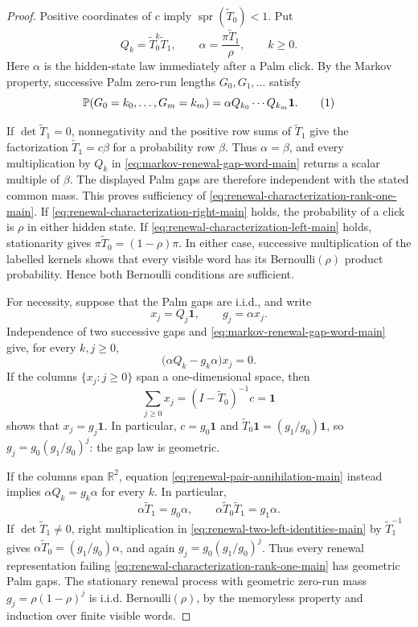 \begin{proof}
Positive coordinates of \(c\) imply
\(\operatorname{spr}(\widetilde T_0)<1\).  Put
\[
 Q_k=\widetilde T_0^k\widetilde T_1,
 \qquad
 \alpha=\frac{\pi\widetilde T_1}{\rho},
 \qquad k\ge0.
\]
Here \(\alpha\) is the hidden-state law immediately after a Palm click.  By
the Markov property, successive Palm zero-run lengths \(G_0,G_1,\ldots\)
satisfy
\[
 \mathbb{P}(G_0=k_0,\ldots,G_m=k_m)
 =\alpha Q_{k_0}\cdots Q_{k_m}\mathbf1.       \tag{1}\label{eq:markov-renewal-gap-word-main}
\]

If \(\det\widetilde T_1=0\), nonnegativity and the positive row sums of
\(\widetilde T_1\) give the factorization
\(\widetilde T_1=c\beta\) for a probability row \(\beta\).  Thus
\(\alpha=\beta\), and every multiplication by \(Q_k\) in
\eqref{eq:markov-renewal-gap-word-main} returns a scalar multiple of
\(\beta\).  The displayed Palm gaps are therefore independent with the
stated common mass.  This proves sufficiency of
\eqref{eq:renewal-characterization-rank-one-main}.  If
\eqref{eq:renewal-characterization-right-main} holds, the probability of a
click is \(\rho\) in either hidden state.  If
\eqref{eq:renewal-characterization-left-main} holds, stationarity gives
\(\pi\widetilde T_0=(1-\rho)\pi\).  In either case, successive multiplication
of the labelled kernels shows that every visible word has its
Bernoulli\((\rho)\) product probability.  Hence both Bernoulli conditions are
sufficient.

For necessity, suppose that the Palm gaps are i.i.d., and write
\[
 x_j=Q_j\mathbf1,
 \qquad
 g_j=\alpha x_j.
\]
Independence of two successive gaps and \eqref{eq:markov-renewal-gap-word-main}
give, for every \(k,j\ge0\),
\[
 \bigl(\alpha Q_k-g_k\alpha\bigr)x_j=0.        \tag{2}\label{eq:renewal-pair-annihilation-main}
\]
If the columns \(\{x_j:j\ge0\}\) span a one-dimensional space, then
\[
 \sum_{j\ge0}x_j
 = (I-\widetilde T_0)^{-1}c=\mathbf1
\]
shows that \(x_j=g_j\mathbf1\).  In particular,
\(c=g_0\mathbf1\) and
\(\widetilde T_0\mathbf1=(g_1/g_0)\mathbf1\), so
\(g_j=g_0(g_1/g_0)^j\): the gap law is geometric.

If the columns span \(\mathbb R^2\), equation
\eqref{eq:renewal-pair-annihilation-main} instead implies
\(\alpha Q_k=g_k\alpha\) for every \(k\).  In particular,
\[
 \alpha\widetilde T_1=g_0\alpha,
 \qquad
 \alpha\widetilde T_0\widetilde T_1=g_1\alpha.       \tag{3}\label{eq:renewal-two-left-identities-main}
\]
If \(\det\widetilde T_1\ne0\), right multiplication in
\eqref{eq:renewal-two-left-identities-main} by
\(\widetilde T_1^{-1}\) gives
\(\alpha\widetilde T_0=(g_1/g_0)\alpha\), and again
\(g_j=g_0(g_1/g_0)^j\).  Thus every renewal representation failing
\eqref{eq:renewal-characterization-rank-one-main} has geometric Palm gaps.
The stationary renewal process with geometric zero-run mass
\(g_j=\rho(1-\rho)^j\) is i.i.d. Bernoulli\((\rho)\), by the memoryless
property and induction over finite visible words.


\end{proof}
